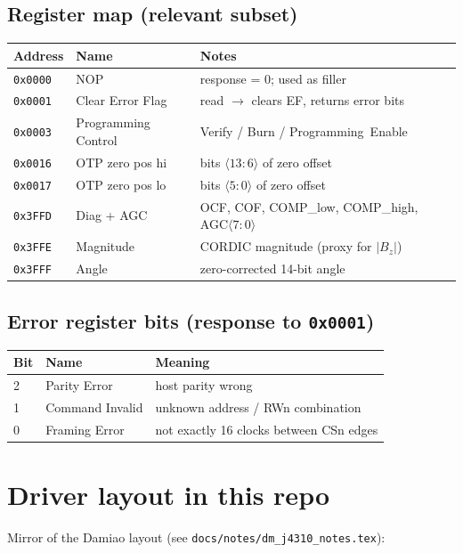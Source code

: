 \documentclass[11pt,a4paper]{article}
\begin{document}
\subsection{Register map (relevant subset)}
\begin{center}\small
\begin{tabular}{lll}
\toprule
Address & Name & Notes\\
\midrule
\texttt{0x0000} & NOP                & response = 0; used as filler\\
\texttt{0x0001} & Clear Error Flag   & read $\to$ clears EF, returns error bits\\
\texttt{0x0003} & Programming Control& Verify / Burn / Programming~Enable\\
\texttt{0x0016} & OTP zero pos hi    & bits $\langle 13\!:\!6\rangle$ of zero offset\\
\texttt{0x0017} & OTP zero pos lo    & bits $\langle 5\!:\!0\rangle$ of zero offset\\
\texttt{0x3FFD} & Diag + AGC         & OCF, COF, COMP\_low, COMP\_high, AGC$\langle 7\!:\!0\rangle$\\
\texttt{0x3FFE} & Magnitude          & CORDIC magnitude (proxy for $|B_z|$)\\
\texttt{0x3FFF} & Angle              & zero-corrected 14-bit angle\\
\bottomrule
\end{tabular}
\end{center}

\subsection{Error register bits (response to \texttt{0x0001})}
\begin{center}\small
\begin{tabular}{lll}
\toprule
Bit & Name & Meaning\\
\midrule
2 & Parity Error    & host parity wrong\\
1 & Command Invalid & unknown address / RWn combination\\
0 & Framing Error   & not exactly 16 clocks between CSn edges\\
\bottomrule
\end{tabular}
\end{center}

\section{Driver layout in this repo}
Mirror of the Damiao layout (see \texttt{docs/notes/dm\_j4310\_notes.tex}):
\end{document}
